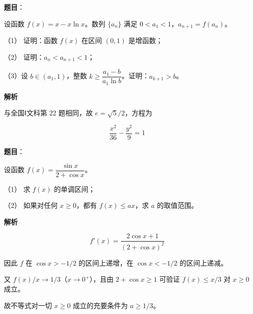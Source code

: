 \begin{answer}

\textbf{题目}：

设函数 $f(x)=x-x\ln x$。数列 $\{a_n\}$ 满足 $0<a_1<1$，$a_{n+1}=f(a_n)$。

（1） 证明：函数 $f(x)$ 在区间 $(0,1)$ 是增函数；

（2） 证明：$a_n<a_{n+1}<1$；

（3）设 $b\in(a_1,1)$，整数 $k\geqslant\dfrac{a_1-b}{a_1\ln b}$。证明：$a_{k+1}>b$。

\textbf{解析}


与全国Ⅰ文科第 22 题相同，故 $e=\sqrt5/2$，方程为


\nopagebreak[4]
\[
\frac{x^2}{36}-\frac{y^2}{9}=1
\]



\end{answer}
\begin{answer}

\textbf{题目}：

设函数 $f(x)=\dfrac{\sin x}{2+\cos x}$。

（1） 求 $f(x)$ 的单调区间；

（2） 如果对任何 $x\geqslant0$，都有 $f(x)\leqslant ax$，求 $a$ 的取值范围。

\textbf{解析}


\nopagebreak[4]
\[
f'(x)=\frac{2\cos x+1}{(2+\cos x)^2}
\]

因此 $f$ 在 $\cos x>-1/2$ 的区间上递增，在 $\cos x<-1/2$ 的区间上递减。

又 $f(x)/x\to1/3$（$x\to0^+$），且由 $2+\cos x\geqslant1$ 可验证 $f(x)\leqslant x/3$ 对 $x\geqslant0$ 成立。


故不等式对一切 $x\geqslant0$ 成立的充要条件为 $a\geqslant1/3$。



\end{answer}